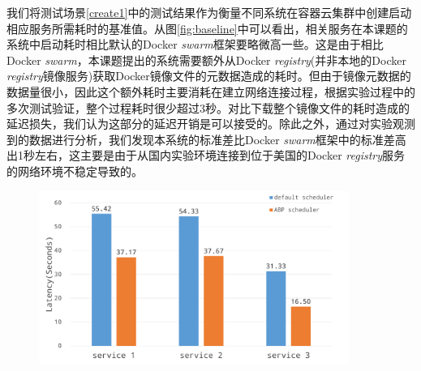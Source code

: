 我们将测试场景\ref{create1}中的测试结果作为衡量不同系统在容器云集群中创建启动相应服务所需耗时的基准值。从图\ref{fig:baseline}中可以看出，相关服务在本课题的系统中启动耗时相比默认的Docker \emph{swarm}框架要略微高一些。这是由于相比Docker \emph{swarm}，本课题提出的系统需要额外从Docker \emph{registry}(并非本地的Docker \emph{registry}镜像服务)获取Docker镜像文件的元数据造成的耗时。但由于镜像元数据的数据量很小，因此这个额外耗时主要消耗在建立网络连接过程，根据实验过程中的多次测试验证，整个过程耗时很少超过3秒。对比下载整个镜像文件的耗时造成的延迟损失，我们认为这部分的延迟开销是可以接受的。除此之外，通过对实验观测到的数据进行分析，我们发现本系统的标准差比Docker \emph{swarm}框架中的标准差高出1秒左右，这主要是由于从国内实验环境连接到位于美国的Docker \emph{registry}服务的网络环境不稳定导致的。

\begin{figure}[htbp]
\centering
\includegraphics[width=0.9\textwidth]{./figure/4ins2rep}
\end{figure}

